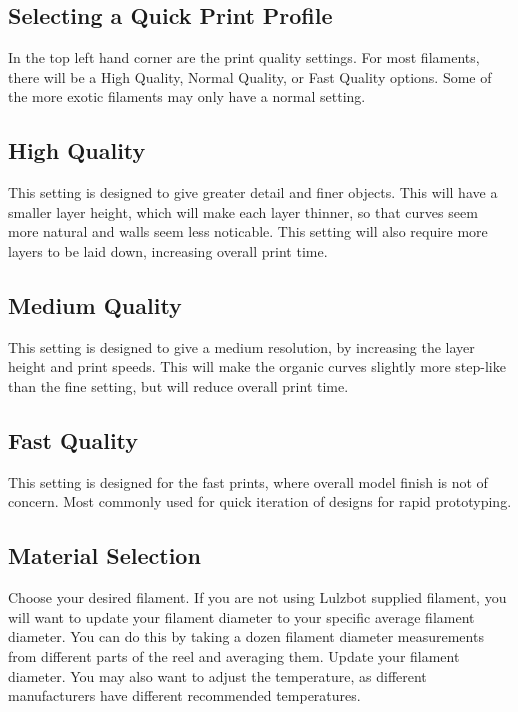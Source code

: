 \subsection{Selecting a Quick Print Profile}
In the top left hand corner are the print quality settings. For most filaments, there will be a High Quality, Normal Quality, or Fast Quality options. Some of the more exotic filaments may only have a normal setting.

\subsection{High Quality}

This setting is designed to give greater detail and finer objects. This will have a smaller layer height, which will make each layer thinner, so that curves seem more natural and walls seem less noticable. This setting will also require more layers to be laid down, increasing overall print time.

\subsection{Medium Quality}

This setting is designed to give a medium resolution, by increasing the layer height and print speeds. This will make the organic curves slightly more step-like than the fine setting, but will reduce overall print time. 

\subsection{Fast Quality}

This setting is designed for the fast prints, where overall model finish is not of concern. Most commonly used for quick iteration of designs for rapid prototyping.

\subsection{Material Selection}

Choose your desired filament. If you are not using Lulzbot supplied filament, you will want to update your filament diameter to your specific average filament diameter. You can do this by taking a dozen filament diameter measurements from different parts of the reel and averaging them. Update your filament diameter. You may also want to adjust the temperature, as different manufacturers have different recommended temperatures.

